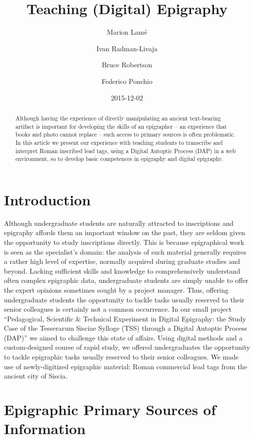 \documentclass[amsthm,ebook]{saparticle}
\title{Teaching (Digital) Epigraphy}
\author[ilc]{Marion Lamé\corref{first}}
\author[zag]{Ivan Radman-Livaja}
\author[mau]{Bruce Robertson}
\author[isti]{Federico Ponchio}
\date{2015-12-02}
\begin{document}
\maketitle
\begin{abstract}
Although having the experience of directly manipulating an ancient text-bearing artifact is important for developing the
skills of an epigrapher – an experience that books and photo cannot replace – such access to primary sources is often
problematic. In this article we present our experience with teaching students to transcribe and interpret Roman
inscribed lead tags, using a Digital Autoptic Process (DAP) in a web environment, so to develop basic competences in
epigraphy and digital epigraphy.
\end{abstract}

\section{Introduction}

\noindent Although undergraduate students are naturally attracted to inscriptions and epigraphy affords them an important window
on the past, they are seldom given the opportunity to study inscriptions directly. This is because epigraphical work is
seen as the specialist’s domain: the analysis of such material generally requires a rather high level of expertise,
normally acquired during graduate studies and beyond. Lacking sufficient skills and knowledge to comprehensively
understand often complex epigraphic data, undergraduate students are simply unable to offer the expert opinions
sometimes sought by a project manager. Thus, offering undergraduate students the opportunity to tackle tasks usually
reserved to their senior colleagues is certainly not a common occurrence. In our small project ``Pedagogical,
Scientific \& Technical Experiment in Digital Epigraphy: the Study Case of the Tesserarum Sisciae Sylloge (TSS) through
a Digital Autoptic Process (DAP)'' we aimed to challenge this state of affairs. Using digital methods and a
custom-designed course of rapid study, we offered undergraduates the opportunity to tackle epigraphic tasks usually
reserved to their senior colleagues. We made use of newly-digitized epigraphic material: Roman commercial lead tags
from the ancient city of Siscia.

\section{Epigraphic Primary Sources of Information}
\end{document}
